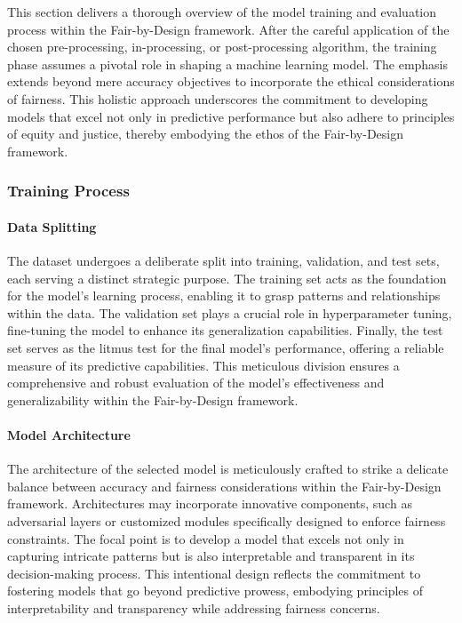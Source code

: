 This section delivers a thorough overview of the model training and evaluation process within the Fair-by-Design framework. After the careful application of the chosen pre-processing, in-processing, or post-processing algorithm, the training phase assumes a pivotal role in shaping a machine learning model. The emphasis extends beyond mere accuracy objectives to incorporate the ethical considerations of fairness. This holistic approach underscores the commitment to developing models that excel not only in predictive performance but also adhere to principles of equity and justice, thereby embodying the ethos of the Fair-by-Design framework.

\subsubsection{Training Process}

\paragraph{Data Splitting}

The dataset undergoes a deliberate split into training, validation, and test sets, each serving a distinct strategic purpose. The training set acts as the foundation for the model's learning process, enabling it to grasp patterns and relationships within the data. The validation set plays a crucial role in hyperparameter tuning, fine-tuning the model to enhance its generalization capabilities. Finally, the test set serves as the litmus test for the final model's performance, offering a reliable measure of its predictive capabilities. This meticulous division ensures a comprehensive and robust evaluation of the model's effectiveness and generalizability within the Fair-by-Design framework.

\paragraph{Model Architecture}

The architecture of the selected model is meticulously crafted to strike a delicate balance between accuracy and fairness considerations within the Fair-by-Design framework. Architectures may incorporate innovative components, such as adversarial layers or customized modules specifically designed to enforce fairness constraints. The focal point is to develop a model that excels not only in capturing intricate patterns but is also interpretable and transparent in its decision-making process. This intentional design reflects the commitment to fostering models that go beyond predictive prowess, embodying principles of interpretability and transparency while addressing fairness concerns.

